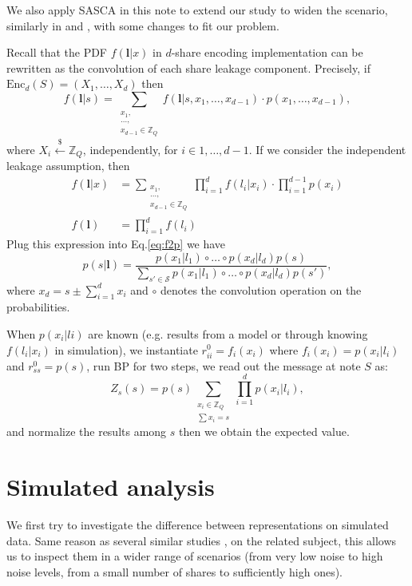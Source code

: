\documentclass{llncs}
\begin{document}
	We also apply SASCA in this note to extend our study to widen the scenario, similarly in \cite{primemask} and \cite{mshares}, with some changes to fit our problem.
	
	Recall that the PDF $f(\bm{l}|x)$ in $d$-share encoding implementation can be rewritten as the convolution of each share leakage component. Precisely, if $\text{Enc}_d(S) = (X_1, \dots, X_d)$ then 
	\begin{equation}
		f(\bm{l}|s) = \sum_{\substack{x_1,\\\dots, \\x_{d-1} \in \mathbb{Z}_Q}}f(\bm{l}|s, x_1, \dots, x_{d-1})\cdot p(x_1, \dots, x_{d-1}),
	\end{equation}
	where $X_i \overset{\$}{\leftarrow} \mathbb{Z}_Q$, independently, for $i\in {1, \dots, d-1}$. If we consider the independent leakage assumption, then
	\begin{align}
		f(\bm{l}|x) &= \sum_{\substack{x_1,\\\dots, \\x_{d-1} \in  \mathbb{Z}_Q}}\prod_{i=1}^{d}f(l_i|x_i)\cdot \prod_{i=1}^{d-1}p(x_i)\\
		f(\bm{l}) &= \prod_{i=1}^{d}f(l_i)
	\end{align}
	Plug this expression into Eq.\ref{eq:f2p} we have
	\begin{equation}
		p\left( s|\bm{l}\right)  = \frac{p\left( x_1|l_1\right) \circ \dots \circ p\left( x_d|l_d\right) p(s)}{\sum_{s'\in \mathcal{S}}p\left( x_1|l_1\right) \circ \dots \circ p\left( x_d|l_d\right)  p(s')}, 
	\end{equation}
	where $x_d = s \pm \sum_{i=1}^d x_i$ and $\circ$ denotes the convolution operation on the probabilities.
	
	When $p(x_i|li)$ are known (e.g. results from a model or through knowing $f(l_i|x_i)$ in simulation), we instantiate $r^0_{ii} = f_i(x_i)$ where $f_i(x_i) = p(x_i|l_i)$ and $r^0_{ss} = p(s)$, run BP for two steps, we read out the message at note $S$ as:
	\begin{equation}
		Z_s(s) = p(s)\sum_{\substack{x_i\in  \mathbb{Z}_Q \\ \sum x_i = s}} \prod_{i=1}^{d} p\left( x_i|l_i\right), 
	\end{equation} 
	and normalize the results among $s$ then we obtain the expected value.
	
	
	\section{Simulated analysis} \label{sec:sim}
	We first try to investigate the difference between representations on simulated data. Same reason as several similar studies \cite{distinguishers}, \cite{primemask} on the related subject, this allows us to inspect them in a wider range of scenarios (from very low noise to high noise levels, from a small number of shares to sufficiently high ones).
	
\end{document}
